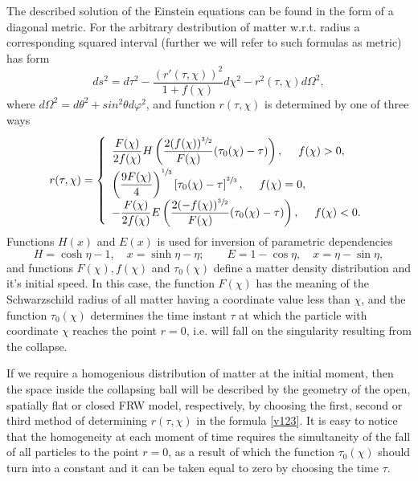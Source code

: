\documentclass[12pt]{article}
\newcommand{\bq}{\begin{equation}}
\newcommand{\eq}{\end{equation}}
\renewcommand{\sh}{\sinh}
\renewcommand{\ch}{\cosh}
\begin{document}
The described solution of the Einstein equations can be found in the form of a diagonal metric. For the arbitrary destribution of matter w.r.t. radius a corresponding squared interval (further we will refer to such formulas as metric) has form \cite{landavshic2}
\bq
\label{metric}
	d s^2 = d \tau^2 - \frac{(r'(\tau, \chi))^2}{1+f(\chi)} d\chi^2 - r^2(\tau, \chi) d \Omega^2,
\eq
where $d\Omega^2=d\theta^2+sin^2\theta d\varphi^2$, and
function $r(\tau, \chi)$ is determined by one of three ways
\bq
\label{v123}
	r(\tau, \chi) = \left\{
	\begin{array}{l}
	\vphantom{\Biggr(}
    \dfrac{F(\chi)}{2 f(\chi)} H \left( \dfrac{2(f(\chi))^{\sfrac{3}{2}} }{F(\chi)}(\tau_0(\chi)-\tau)  \right) , \ \ \ \ f(\chi) > 0,\\
	\left( \dfrac{9F(\chi)}{4} \right)^{\sfrac{1}{3}} \left[ \tau_0(\chi)- \tau \right]^{\sfrac{2}{3}}, \ \ \ \ f(\chi) = 0, \\
	- \dfrac{F(\chi)}{2 f(\chi)} E \left( \dfrac{2(-f(\chi))^{\sfrac{3}{2}} }{F(\chi)}(\tau_0(\chi)-\tau) \right), \ \ \ \ f(\chi) < 0.
	\end{array} \right.
\eq
Functions $H(x)$ and $E(x)$ is used for inversion of parametric dependencies
\bq\label{sp4}
H = \ch{\eta}-1,\quad x = \sh{\eta} - \eta;\qquad
E = 1 - \cos{\eta},\quad x = \eta - \sin{\eta},
\eq
and functions $F(\chi), f(\chi)$ and $\tau_0(\chi)$ define a matter density distribution and it's initial speed.
In this case, the function $F(\chi)$ has the meaning of the Schwarzschild radius of all matter having a coordinate value less than $\chi$, and the function $\tau_0 (\chi)$ determines the time instant $\tau$ at which the particle with coordinate $\chi$ reaches the point $r = 0$, i.e. will fall on the singularity resulting from the collapse.

If we require a homogenious distribution of matter at the initial moment, then the space inside the collapsing ball will be described by the geometry of the open, spatially flat or closed FRW model, respectively, by choosing the first, second or third method of determining $ r(\tau, \chi)$ in the formula \eqref{v123}.
It is easy to notice that the homogeneity at each moment of time requires the simultaneity of the fall of all particles to the point $r = 0$, as a result of which the function $\tau_0(\chi)$ should turn into a constant and it can be taken equal to zero by choosing the time $\tau$.
\end{document}
